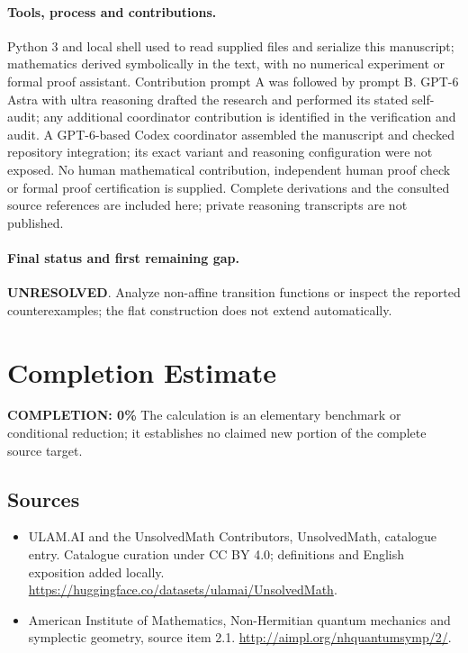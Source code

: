 \documentclass[11pt]{article}
\begin{document}
\paragraph{Tools, process and contributions.}
Python 3 and local shell used to read supplied files and serialize this manuscript; mathematics derived symbolically in the text, with no numerical experiment or formal proof assistant. Contribution prompt A was followed by prompt B. GPT-6 Astra with ultra reasoning drafted the research and performed its stated self-audit; any additional coordinator contribution is identified in the verification and audit. A GPT-6-based Codex coordinator assembled the manuscript and checked repository integration; its exact variant and reasoning configuration were not exposed. No human mathematical contribution, independent human proof check or formal proof certification is supplied. Complete derivations and the consulted source references are included here; private reasoning transcripts are not published.

\paragraph{Final status and first remaining gap.}
\textbf{UNRESOLVED}. Analyze non-affine transition functions or inspect the reported counterexamples; the flat construction does not extend automatically.

\section{Completion Estimate}
\noindent\textbf{COMPLETION: 0\%}
The calculation is an elementary benchmark or conditional reduction; it establishes no claimed new portion of the complete source target.

\subsection{Sources}
\begin{itemize}
\item[\hypertarget{source:statement:1}{S1}] ULAM.AI and the UnsolvedMath Contributors, UnsolvedMath, catalogue entry. Catalogue curation under CC BY 4.0; definitions and English exposition added locally.
\url{https://huggingface.co/datasets/ulamai/UnsolvedMath}.
\item[\hypertarget{source:statement:2}{S2}] American Institute of Mathematics, Non-Hermitian quantum mechanics and symplectic geometry, source item 2.1.
\url{http://aimpl.org/nhquantumsymp/2/}.
\end{itemize}
\label{end:statement}
\end{document}
